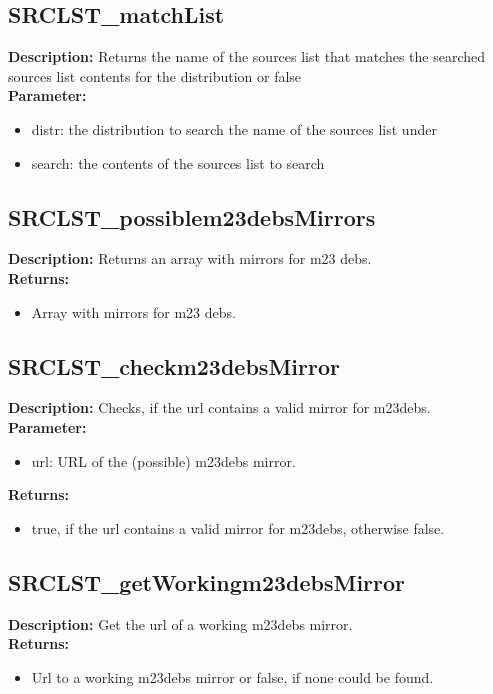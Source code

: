 \subsection{SRCLST\_matchList}
\textbf{Description:} Returns the name of the sources list that matches the searched sources list contents for the distribution or false\\
\textbf{Parameter:}
\begin{itemize}
\item distr: the distribution to search the name of the sources list under
\item search: the contents of the sources list to search
\end{itemize}

\subsection{SRCLST\_possiblem23debsMirrors}
\textbf{Description:} Returns an array with mirrors for m23 debs.\\
\textbf{Returns:}
\begin{itemize}
\item Array with mirrors for m23 debs.
\end{itemize}

\subsection{SRCLST\_checkm23debsMirror}
\textbf{Description:} Checks, if the url contains a valid mirror for m23debs.\\
\textbf{Parameter:}
\begin{itemize}
\item url: URL of the (possible) m23debs mirror.
\end{itemize}
\textbf{Returns:}
\begin{itemize}
\item true, if the url contains a valid mirror for m23debs, otherwise false.
\end{itemize}

\subsection{SRCLST\_getWorkingm23debsMirror}
\textbf{Description:} Get the url of a working m23debs mirror.\\
\textbf{Returns:}
\begin{itemize}
\item Url to a working m23debs mirror or false, if none could be found.
\end{itemize}

